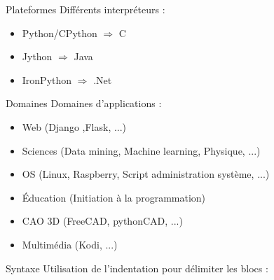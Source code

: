 \begin{frame}{Plateformes}
  Différents interpréteurs :
  \begin{itemize}
  \item Python/CPython $\Rightarrow$ C
  \item Jython $\Rightarrow$ Java
  \item IronPython $\Rightarrow$ .Net
  \end{itemize}
\end{frame}

\begin{frame}{Domaines}
  Domaines d'applications :
  \begin{itemize}
  \item Web (Django ,Flask, ...)
  \item Sciences (Data mining, Machine learning, Physique, ...)
  \item OS (Linux, Raspberry, Script administration système, ...)
  \item Éducation (Initiation à la programmation)
  \item CAO 3D (FreeCAD, pythonCAD, ...)
  \item Multimédia (Kodi, ...)
  \end{itemize}
\end{frame}

\begin{frame}{Syntaxe}
  Utilisation de l'indentation pour délimiter les blocs :
\end{frame}
